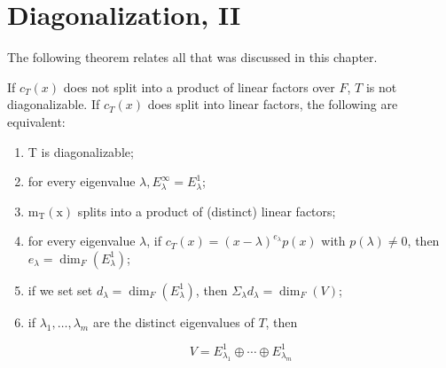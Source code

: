 \section{Diagonalization, II}
    The following theorem relates all that was discussed in this chapter.
    \begin{theorem}
    If $c_T(x)$ does not split into a product of linear factors over $F$, $T$ is not diagonalizable. If $c_T(x)$ does split into linear factors, the following are equivalent:
        \begin{enumerate}[label = (\arabic*)]
            \item T is diagonalizable;
            \item for every eigenvalue $\lambda, E_\lambda^{\infty}=E_\lambda^1$;
            \item $\mathrm{m}_{\mathrm{T}}(\mathrm{x})$ splits into a product of (distinct) linear factors;
            \item for every eigenvalue $\lambda$, if $c_T(x)=(x-\lambda)^{e_\lambda} p(x)$ with $p(\lambda) \neq 0$, then $e_\lambda=\operatorname{dim}_F\left(E_\lambda^1\right)$;
            \item if we set set $d_\lambda=\operatorname{dim}_F\left(E_\lambda^1\right)$, then $\Sigma_\lambda d_\lambda=\operatorname{dim}_F(V)$;
            \item if $\lambda_1, \ldots, \lambda_m$ are the distinct eigenvalues of $T$, then

            $$
            V=E_{\lambda_1}^1 \oplus \cdots \oplus E_{\lambda_m}^1
            $$
        \end{enumerate}
    \end{theorem}



            

    
        



    

    


